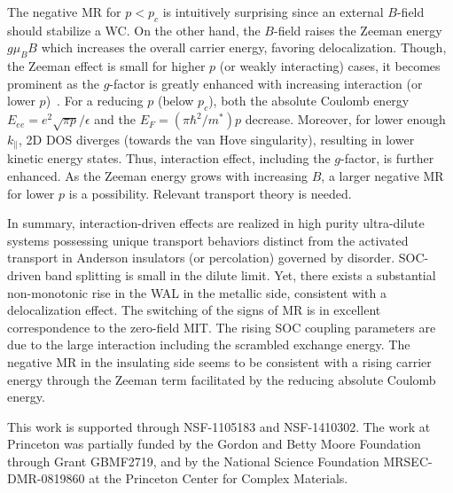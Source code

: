 \documentclass[twocolumn,secnumarabic,amssymb, nobibnotes, aps, prd]{revtex4-1}
\begin{document}
The negative MR for $p<p_c$ is intuitively surprising since an external $B$-field should stabilize a WC. On the other hand, the $B$-field raises the Zeeman energy $g\mu_B B$ which increases the overall carrier energy, favoring delocalization. Though, the Zeeman effect is small for higher $p$ (or weakly interacting) cases, it becomes prominent as the $g$-factor is greatly enhanced with increasing interaction (or lower $p$)~\cite{g-enhanced}. For a reducing $p$ (below $p_c$), both the absolute Coulomb energy $E_{ee}=e^2\sqrt{\pi p}/\epsilon$ and the $E_F=(\pi\hbar^2/m^*)p$ decrease. Moreover, for lower enough $k_{\parallel}$, 2D DOS diverges (towards the van Hove singularity), resulting in lower kinetic energy states. Thus, interaction effect, including the $g$-factor, is further enhanced.  As the Zeeman energy grows with increasing $B$, a larger negative MR for lower $p$ is a possibility. Relevant transport theory is needed.   %

In summary, interaction-driven effects are realized in high purity ultra-dilute systems possessing unique transport behaviors distinct from the activated transport in Anderson insulators (or percolation) governed by disorder. SOC-driven band splitting is small in the dilute limit. Yet, there exists a substantial non-monotonic rise in the WAL in the metallic side, consistent with a delocalization effect. The switching of the signs of MR is in excellent correspondence to the zero-field MIT. The rising SOC coupling parameters are due to the large interaction including the scrambled exchange energy. The negative MR in the insulating side seems to be consistent with a rising carrier energy through the Zeeman term facilitated by the reducing absolute Coulomb energy. 

This work is supported through NSF-1105183 and NSF-1410302. The work at Princeton was partially funded by the Gordon and Betty Moore Foundation through Grant GBMF2719, and by the National Science Foundation MRSEC-DMR-0819860 at the Princeton Center for Complex Materials.


\end{document}
